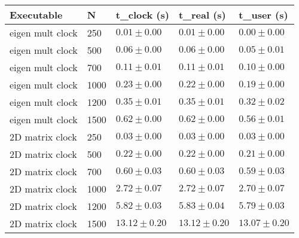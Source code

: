 \begin{table}[h!]   
    \centering
    \begin{tabular}{|l|l|l|l|l|}    
        \hline
        \textbf{Executable} & \textbf{N}    & \textbf{t\_clock (s)}  & \textbf{t\_real (s)}  & \textbf{t\_user (s)} \\
        \hline
        eigen mult clock    & 250           & \(0.01 \pm 0.00\)     & \(0.01 \pm 0.00\)    & \(0.00 \pm 0.00\)    \\
        eigen mult clock    & 500           & \(0.06 \pm 0.00\)     & \(0.06 \pm 0.00\)    & \(0.05 \pm 0.01\)    \\
        eigen mult clock    & 700           & \(0.11 \pm 0.01\)     & \(0.11 \pm 0.01\)    & \(0.10 \pm 0.00\)    \\
        eigen mult clock    & 1000          & \(0.23 \pm 0.00\)     & \(0.22 \pm 0.00\)    & \(0.19 \pm 0.00\)    \\
        eigen mult clock    & 1200          & \(0.35 \pm 0.01\)     & \(0.35 \pm 0.01\)    & \(0.32 \pm 0.02\)    \\
        eigen mult clock    & 1500          & \(0.62 \pm 0.00\)     & \(0.62 \pm 0.00\)    & \(0.56 \pm 0.01\)    \\
        2D matrix clock     & 250           & \(0.03 \pm 0.00\)     & \(0.03 \pm 0.00\)    & \(0.03 \pm 0.00\)    \\
        2D matrix clock     & 500           & \(0.22 \pm 0.00\)     & \(0.22 \pm 0.00\)    & \(0.21 \pm 0.00\)    \\
        2D matrix clock     & 700           & \(0.60 \pm 0.03\)     & \(0.60 \pm 0.03\)    & \(0.59 \pm 0.03\)    \\
        2D matrix clock     & 1000          & \(2.72 \pm 0.07\)     & \(2.72 \pm 0.07\)    & \(2.70 \pm 0.07\)    \\
        2D matrix clock     & 1200          & \(5.82 \pm 0.03\)     & \(5.83 \pm 0.04\)    & \(5.79 \pm 0.03\)    \\
        2D matrix clock     & 1500          & \(13.12 \pm 0.20\)    & \(13.12 \pm 0.20\)   & \(13.07 \pm 0.20\)   \\
        \hline
    \end{tabular}
\end{table}

